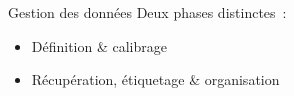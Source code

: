 \begin{frame}{Gestion des données}
  Deux phases distinctes~:
  \begin{itemize}
    \item Définition \& calibrage
    \item Récupération, étiquetage \& organisation
  \end{itemize}
\end{frame}
